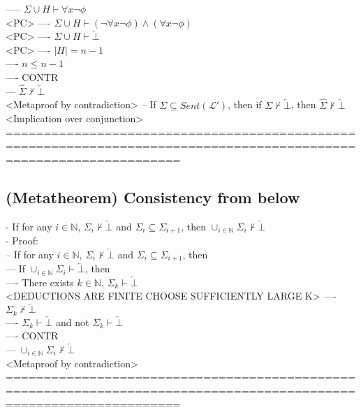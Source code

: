 \documentclass{book}
\newcommand{\inot}{\not}
\newcommand{\contr}{\overleftarrow{\bot}}
\begin{document}
					----- $\Sigma \cup H \vdash \forall x \lnot \phi$ \\ <PC>
				---- $\Sigma \cup H \vdash (\lnot \forall x \lnot \phi) \land (\forall x \lnot \phi)$ \\ <PC>
				---- $\Sigma \cup H \vdash \contr$ \\ <PC>
				---- $|H| = n-1$ \\
				---- $n \leq n-1$ \\
				---- CONTR \\
			--- $\hat{\Sigma} \inot \vdash \contr$ \\ <Metaproof by contradiction>
		-- If $\Sigma \subseteq Sent(\mathcal{L}')$, then if $\Sigma \inot \vdash \contr$, then $\hat{\Sigma} \inot \vdash \contr$ \\ <Implication over conjunction>
	===================================================================================================================
\subsection{(Metatheorem) Consistency from below} %
	- If for any $i \in \mathbb{N}$, $\Sigma_i \inot \vdash \contr$ and $\Sigma_i \subseteq \Sigma_{i+1}$, then $\cup_{i \in \mathbb{N}} \Sigma_i \inot \vdash \contr$ \\
	- Proof: \\
		-- If for any $i \in \mathbb{N}$, $\Sigma_i \inot \vdash \contr$ and $\Sigma_i \subseteq \Sigma_{i+1}$, then \\
			--- If $\cup_{i \in \mathbb{N}} \Sigma_i \vdash \contr$, then \\
				---- There exists $k \in \mathbb{N}$, $\Sigma_k \vdash \contr$ \\ <DEDUCTIONS ARE FINITE CHOOSE SUFFICIENTLY LARGE K>
				---- $\Sigma_k \inot \vdash \contr$ \\
				---- $\Sigma_k \vdash \contr$ and not $\Sigma_k \vdash \contr$ \\
				---- CONTR \\
			--- $\cup_{i \in \mathbb{N}} \Sigma_i \inot \vdash \contr$ \\ <Metaproof by contradiction>
	===================================================================================================================
\end{document}
